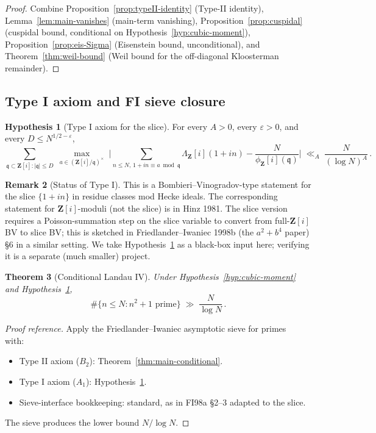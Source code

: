 \documentclass[11pt]{article}
\newtheorem{theorem}{Theorem}[section]
\theoremstyle{definition}
\newtheorem{hypothesis}[theorem]{Hypothesis}
\newtheorem{remark}[theorem]{Remark}
\newcommand{\Z}{\mathbf{Z}}
\newcommand{\Zi}{\Z[i]}
\newcommand{\qq}{\mathfrak{q}}
\begin{document}
\begin{proof}
Combine Proposition~\ref{prop:typeII-identity} (Type-II identity), Lemma~\ref{lem:main-vanishes} (main-term vanishing), Proposition~\ref{prop:cuspidal} (cuspidal bound, conditional on Hypothesis~\ref{hyp:cubic-moment}), Proposition~\ref{prop:eis-Sigma} (Eisenstein bound, unconditional), and Theorem~\ref{thm:weil-bound} (Weil bound for the off-diagonal Kloosterman remainder).
\end{proof}

\subsection{Type I axiom and FI sieve closure}\label{ssec:type-I}

\begin{hypothesis}[Type I axiom for the slice]\label{hyp:type-I}
For every $A>0$, every $\varepsilon>0$, and every $D\le N^{1/2-\varepsilon}$,
\[
   \sum_{\qq\subset\Zi:|\qq|\le D}\;\max_{a\in(\Zi/\qq)^\times}\;\Big|\sum_{n\le N,\,1+in\equiv a\bmod\qq}\Lambda_\Zi(1+in)-\frac{N}{\phi_\Zi(\qq)}\Big|\;\ll_A\;\frac{N}{(\log N)^A}\,.
\]
\end{hypothesis}

\begin{remark}[Status of Type I]\label{rem:type-I-status}
This is a Bombieri--Vinogradov-type statement for the slice $\{1+in\}$ in residue classes mod Hecke ideals. The corresponding statement for $\Z[i]$-moduli (not the slice) is in Hinz 1981. The slice version requires a Poisson-summation step on the slice variable to convert from full-$\Z[i]$ BV to slice BV; this is sketched in Friedlander--Iwaniec 1998b (the $a^2+b^4$ paper) §6 in a similar setting. We take Hypothesis~\ref{hyp:type-I} as a black-box input here; verifying it is a separate (much smaller) project.
\end{remark}

\begin{theorem}[Conditional Landau IV]\label{thm:landau-cond}
Under Hypothesis~\ref{hyp:cubic-moment} and Hypothesis~\ref{hyp:type-I},
\[
   \#\{n\le N:n^2+1\text{ prime}\}\;\gg\;\frac{N}{\log N}\,.
\]
\end{theorem}

\begin{proof}[Proof reference]
Apply the Friedlander--Iwaniec asymptotic sieve for primes~\cite{FI98a} with:
\begin{itemize}
\item Type II axiom ($B_2$): Theorem~\ref{thm:main-conditional}.
\item Type I axiom ($A_1$): Hypothesis~\ref{hyp:type-I}.
\item Sieve-interface bookkeeping: standard, as in FI98a §2--3 adapted to the slice.
\end{itemize}
The sieve produces the lower bound $N/\log N$.
\end{proof}
\end{document}
